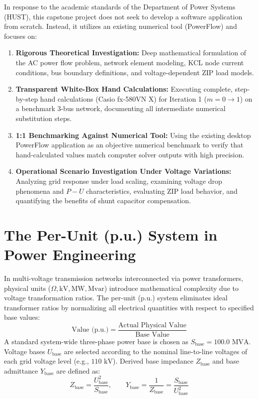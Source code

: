 \documentclass[12pt,a4paper,oneside]{report}
\begin{document}
In response to the academic standards of the Department of Power Systems (HUST), this capstone project does not seek to develop a software application from scratch. Instead, it utilizes an existing numerical tool (PowerFlow) and focuses on:
\begin{enumerate}
    \item \textbf{Rigorous Theoretical Investigation:} Deep mathematical formulation of the AC power flow problem, network element modeling, KCL node current conditions, bus boundary definitions, and voltage-dependent ZIP load models.
    \item \textbf{Transparent White-Box Hand Calculations:} Executing complete, step-by-step hand calculations (Casio fx-580VN X) for Iteration 1 ($m = 0 \to 1$) on a benchmark 3-bus network, documenting all intermediate numerical substitution steps.
    \item \textbf{1:1 Benchmarking Against Numerical Tool:} Using the existing desktop PowerFlow application as an objective numerical benchmark to verify that hand-calculated values match computer solver outputs with high precision.
    \item \textbf{Operational Scenario Investigation Under Voltage Variations:} Analyzing grid response under load scaling, examining voltage drop phenomena and $P-U$ characteristics, evaluating ZIP load behavior, and quantifying the benefits of shunt capacitor compensation.
\end{enumerate}

\section{The Per-Unit (p.u.) System in Power Engineering}
In multi-voltage transmission networks interconnected via power transformers, physical units ($\Omega, \text{kV}, \text{MW}, \text{Mvar}$) introduce mathematical complexity due to voltage transformation ratios. The per-unit (p.u.) system eliminates ideal transformer ratios by normalizing all electrical quantities with respect to specified base values:
\begin{equation}
\text{Value (p.u.)} = \frac{\text{Actual Physical Value}}{\text{Base Value}}
\end{equation}
A standard system-wide three-phase power base is chosen as $S_{\text{base}} = 100.0\text{ MVA}$. Voltage bases $U_{\text{base}}$ are selected according to the nominal line-to-line voltages of each grid voltage level (e.g., $110\text{ kV}$). Derived base impedance $Z_{\text{base}}$ and base admittance $Y_{\text{base}}$ are defined as:
\begin{equation}
Z_{\text{base}} = \frac{U_{\text{base}}^2}{S_{\text{base}}}, \qquad Y_{\text{base}} = \frac{1}{Z_{\text{base}}} = \frac{S_{\text{base}}}{U_{\text{base}}^2}
\end{equation}
\end{document}
